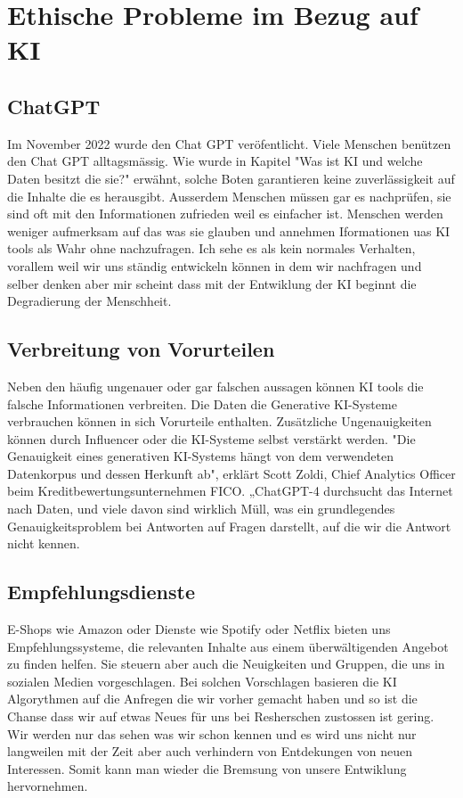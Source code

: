 \documentclass{report}
\begin{document}
 \textbf{}
\textit{}
   
   \chapter{Ethische Probleme im Bezug auf KI}
   \section{ChatGPT} 
   Im November 2022 wurde den Chat GPT veröfentlicht. Viele Menschen benützen den Chat GPT alltagsmässig. Wie wurde in Kapitel
    "Was ist KI und welche Daten besitzt die sie?" erwähnt, solche Boten garantieren keine zuverlässigkeit auf die Inhalte 
    die es herausgibt. Ausserdem Menschen müssen gar es nachprüfen, sie sind oft mit den Informationen zufrieden weil es einfacher ist.
    Menschen werden weniger aufmerksam auf das was sie glauben und annehmen Iformationen uas KI tools als Wahr ohne nachzufragen.
    Ich sehe es als kein normales Verhalten, vorallem weil wir uns ständig entwickeln können in dem wir nachfragen und selber denken 
    aber mir scheint dass mit der Entwiklung der KI beginnt die Degradierung der Menschheit. 
    
    \section {Verbreitung von Vorurteilen}
    Neben den häufig ungenauer oder gar falschen aussagen können KI tools die falsche Informationen verbreiten. Die Daten die  
    Generative KI-Systeme verbrauchen können in sich Vorurteile enthalten. 
    Zusätzliche Ungenauigkeiten können durch Influencer oder die KI-Systeme selbst verstärkt werden.
    "Die Genauigkeit eines generativen KI-Systems hängt von dem verwendeten Datenkorpus und dessen Herkunft ab",
    erklärt Scott Zoldi, Chief Analytics Officer beim Kreditbewertungsunternehmen FICO. „ChatGPT-4 durchsucht das 
    Internet nach Daten, und viele davon sind wirklich Müll, was ein grundlegendes Genauigkeitsproblem bei Antworten auf Fragen 
    darstellt, auf die wir die Antwort nicht kennen.
  
   \section{Empfehlungsdienste}
   E-Shops wie Amazon oder Dienste wie Spotify oder Netflix bieten uns Empfehlungssysteme, die relevanten Inhalte
    aus einem überwältigenden Angebot zu finden helfen. Sie steuern aber auch die Neuigkeiten und Gruppen,
 die uns in sozialen Medien vorgeschlagen. Bei solchen Vorschlagen basieren die KI Algorythmen auf die Anfregen die wir vorher gemacht haben
 und so ist die Chanse dass wir auf etwas Neues für uns bei Resherschen zustossen ist gering. Wir werden nur das 
 sehen was wir schon kennen und es wird uns nicht nur langweilen mit der Zeit aber auch verhindern von Entdekungen von 
 neuen Interessen. Somit kann man wieder die Bremsung von unsere Entwiklung hervornehmen.
\end{document}
